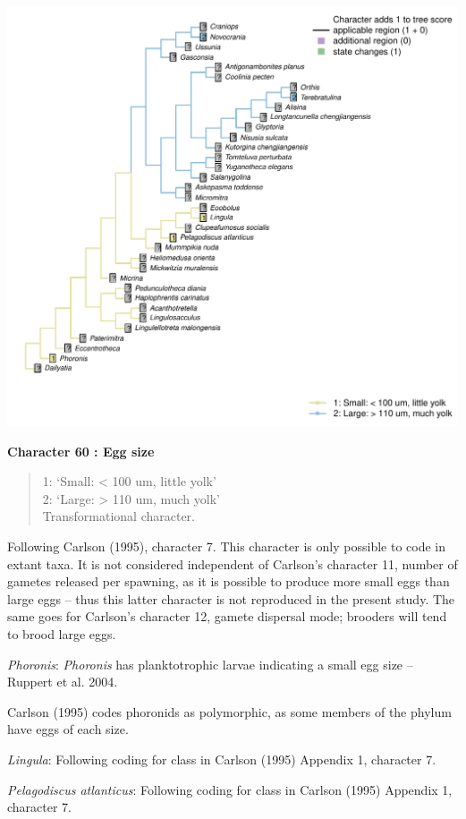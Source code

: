 \documentclass[]{book}
\theoremstyle{definition}
\theoremstyle{definition}
\theoremstyle{definition}
\theoremstyle{remark}
\begin{document}
\includegraphics{Brachiopod_phylogeny_files/figure-latex/unnamed-chunk-5-60.pdf}

\textbf{Character 60 : Egg size }

\begin{quote}
1: `Small: \textless{} 100 um, little yolk'\\
2: `Large: \textgreater{} 110 um, much yolk'\\
Transformational character.
\end{quote}

Following Carlson (1995), character 7. This character is only possible
to code in extant taxa. It is not considered independent of Carlson's
character 11, number of gametes released per spawning, as it is possible
to produce more small eggs than large eggs -- thus this latter character
is not reproduced in the present study. The same goes for Carlson's
character 12, gamete dispersal mode; brooders will tend to brood large
eggs.

\emph{Phoronis}: \emph{Phoronis} has planktotrophic larvae indicating a
small egg size -- Ruppert et al. 2004.

Carlson (1995) codes phoronids as polymorphic, as some members of the
phylum have eggs of each size.

\emph{Lingula}: Following coding for class in Carlson (1995) Appendix 1,
character 7.

\emph{Pelagodiscus atlanticus}: Following coding for class in Carlson
(1995) Appendix 1, character 7.
\end{document}
